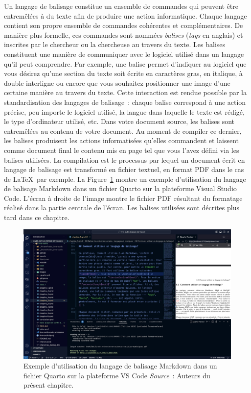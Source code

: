 \documentclass[
  letterpaper,
]{scrbook}
\begin{document}
Un langage de balisage constitue un ensemble de commandes qui peuvent
être entremêlées à du texte afin de produire une action informatique.
Chaque langage contient son propre ensemble de commandes cohérentes et
complémentaires. De manière plus formelle, ces commandes sont nommées
\emph{balises} (\emph{tags} en anglais) et inscrites par le chercheur ou
la chercheuse au travers du texte. Les balises constituent une manière
de communiquer avec le logiciel utilisé dans un langage qu'il peut
comprendre. Par exemple, une balise permet d'indiquer au logiciel que
vous désirez qu'une section du texte soit écrite en caractères gras, en
italique, à double interligne ou encore que vous souhaitez positionner
une image d'une certaine manière au travers du texte. Cette interaction
est rendue possible par la standardisation des langages de balisage~:
chaque balise correspond à une action précise, peu importe le logiciel
utilisé, la langue dans laquelle le texte est rédigé, le type
d'ordinateur utilisé, etc. Dans votre document source, les balises sont
entremêlées au contenu de votre document. Au moment de compiler ce
dernier, les balises produisent les actions informatisées qu'elles
commandent et laissent comme document final le contenu mis en page tel
que vous l'avez défini via les balises utilisées. La compilation est le
processus par lequel un document écrit en langage de balisage est
transformé en fichier textuel, en format PDF dans le cas de \LaTeX~par
exemple. La Figure~\ref{fig-vscode} montre un exemple d'utilisation du
langage de balisage Markdown dans un fichier Quarto sur la plateforme
Visual Studio Code. L'écran à droite de l'image montre le fichier PDF
résultant du formatage réalisé dans la partie centrale de l'écran. Les
balises utilisées sont décrites plus tard dans ce chapitre.

\begin{figure}

{\centering \includegraphics[width=4.8in,height=\textheight]{images/chapitre5_vscode.png}

}

\caption{\label{fig-vscode}Exemple d'utilisation du langage de balisage
Markdown dans un fichier Quarto sur la plateforme VS Code
\newline \textit{Source}~: Auteurs du présent chapitre.}

\end{figure}
\end{document}
